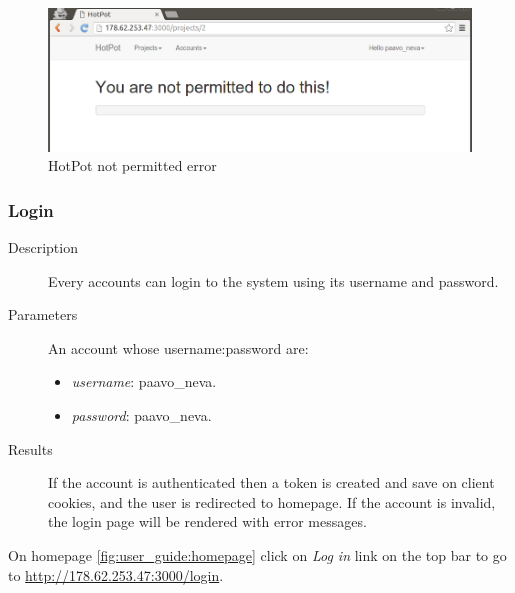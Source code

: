 \begin{figure}[bth]                                                                                                                                                  \myfloatalign
\includegraphics[width=1.0\linewidth]{gfx/chapter_5/general/not_permitted}
\caption[HotPot not permitted error]{HotPot not permitted error}
\label{fig:user_guide:not_permitted}
\end{figure}

\clearpage

\subsubsection{Login}
\label{ch:result:user_guide:miscellaneous:login}

\begin{description}
\item[Description] Every accounts can login to the system using its username and password.
\item[Parameters] An account whose username:password are:
\begin{itemize}
\item \emph{username}: paavo\_neva.
\item \emph{password}: paavo\_neva.
\end{itemize}
\item[Results] If the account is authenticated then a token is created and save on client cookies, and the user is redirected to homepage.
If the account is invalid, the login page will be rendered with error messages.
\end{description}

On homepage \autoref{fig:user_guide:homepage} click on \emph{Log in} link on the top bar to go to \href{http://178.62.253.47:3000/login}{http://178.62.253.47:3000/login}.

